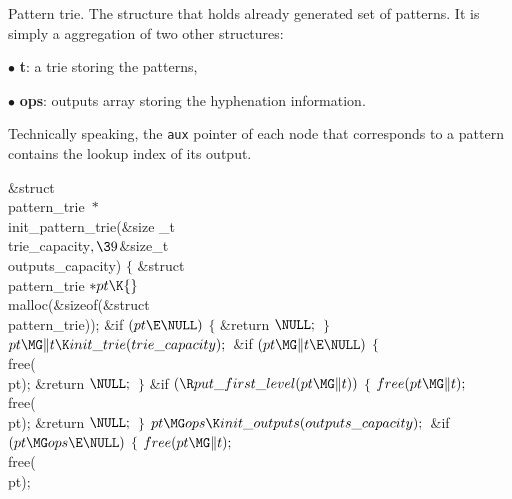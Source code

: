 Pattern trie.
The structure that holds already generated set of patterns. It is simply a
aggregation of two other structures:

\item{$\bullet$} {\bf t}: a trie storing the patterns,
\item{$\bullet$} {\bf ops}: outputs array storing the hyphenation information.

Technically speaking, the {\tt aux} pointer of each node that corresponds to a
pattern contains the lookup index of its
output.

\Y\B\1\1\&{struct} \\{pattern\_trie} ${}{*}{}$\\{init\_pattern\_trie}(\&{size%
\_t} \\{trie\_capacity}${},\39{}$\&{size\_t} \\{outputs\_capacity})\2\2\6
${}\{{}$\1\6
\&{struct} \\{pattern\_trie} ${}{*}\\{pt}\K{}$\\{malloc}(\&{sizeof}(\&{struct} %
\\{pattern\_trie}));\7
\&{if} ${}(\\{pt}\E\NULL){}$\5
${}\{{}$\1\6
\&{return} ${}\NULL;{}$\6
\4${}\}{}$\2\6
${}\\{pt}\MG\|t\K\\{init\_trie}(\\{trie\_capacity});{}$\6
\&{if} ${}(\\{pt}\MG\|t\E\NULL){}$\5
${}\{{}$\1\6
\\{free}(\\{pt});\6
\&{return} ${}\NULL;{}$\6
\4${}\}{}$\2\6
\&{if} ${}(\R\\{put\_first\_level}(\\{pt}\MG\|t)){}$\5
${}\{{}$\1\6
${}\\{free}(\\{pt}\MG\|t);{}$\6
\\{free}(\\{pt});\6
\&{return} ${}\NULL;{}$\6
\4${}\}{}$\2\6
${}\\{pt}\MG\\{ops}\K\\{init\_outputs}(\\{outputs\_capacity});{}$\6
\&{if} ${}(\\{pt}\MG\\{ops}\E\NULL){}$\5
${}\{{}$\1\6
${}\\{free}(\\{pt}\MG\|t);{}$\6
\\{free}(\\{pt});\6
